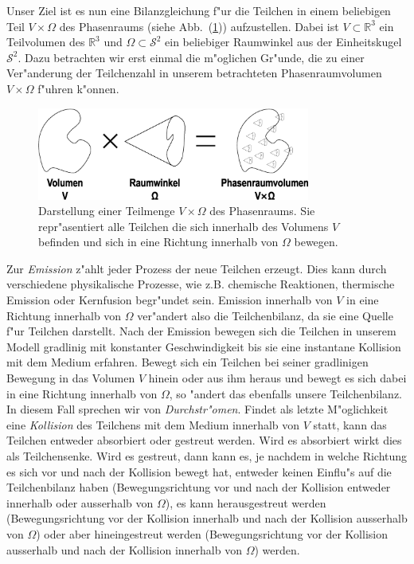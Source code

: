 	Unser Ziel ist es nun eine Bilanzgleichung f"ur die Teilchen in einem beliebigen Teil $V \times \Omega$ des Phasenraums (siehe Abb.~(\ref{fig:phasespacevolume})) aufzustellen. Dabei ist $V \subset \mathbb{R}^3$ ein Teilvolumen des $\mathbb{R}^3$ und $\Omega \subset \mathcal{S}^2$ ein beliebiger Raumwinkel aus der Einheitskugel $\mathcal{S}^2$. Dazu betrachten wir erst einmal die m"oglichen Gr"unde, die zu einer Ver"anderung der Teilchenzahl in unserem betrachteten Phasenraumvolumen $V \times \Omega$ f"uhren k"onnen.
	\begin{figure}
		\centering
		\includegraphics[width=0.8\textwidth]{phasespacevolume.eps}
		\caption{Darstellung einer Teilmenge $V \times \Omega$ des Phasenraums. Sie repr"asentiert alle Teilchen die sich innerhalb des Volumens $V$ befinden und sich in eine Richtung innerhalb von $\Omega$ bewegen.}
		\label{fig:phasespacevolume}
	\end{figure}

	Zur {\em Emission} z"ahlt jeder Prozess der neue Teilchen erzeugt. Dies kann durch verschiedene physikalische Prozesse, wie z.B. chemische Reaktionen, thermische Emission oder Kernfusion begr"undet sein. Emission innerhalb von $V$ in eine Richtung innerhalb von $\Omega$ ver"andert also die Teilchenbilanz, da sie eine Quelle f"ur Teilchen darstellt. Nach der Emission bewegen sich die Teilchen in unserem Modell gradlinig mit konstanter Geschwindigkeit bis sie eine instantane Kollision mit dem Medium erfahren. Bewegt sich ein Teilchen bei seiner gradlinigen Bewegung in das Volumen $V$ hinein oder aus ihm heraus und bewegt es sich dabei in eine Richtung innerhalb von $\Omega$, so "andert das ebenfalls unsere Teilchenbilanz. In diesem Fall sprechen wir von {\em Durchstr"omen}. Findet als letzte M"oglichkeit eine {\em Kollision} des Teilchens mit dem Medium innerhalb von $V$ statt, kann das Teilchen entweder absorbiert oder gestreut werden. Wird es absorbiert wirkt dies als Teilchensenke. Wird es gestreut, dann kann es, je nachdem in welche Richtung es sich vor und nach der Kollision bewegt hat, entweder keinen Einflu"s auf die Teilchenbilanz haben (Bewegungsrichtung vor und nach der Kollision entweder innerhalb oder ausserhalb von $\Omega$), es kann herausgestreut werden (Bewegungsrichtung vor der Kollision innerhalb und nach der Kollision ausserhalb von $\Omega$) oder aber hineingestreut werden (Bewegungsrichtung vor der Kollision ausserhalb und nach der Kollision innerhalb von $\Omega$) werden.
	
